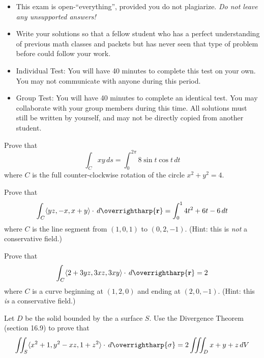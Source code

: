 \documentclass[12pt]{exam}
\newcommand{\harpvec}[1]{\overrightharp{\ensuremath{\mathbf{#1}}}}
\newcommand{\vect}[1]{\harpvec{#1}}
\newcommand{\<}{\langle}
\renewcommand{\>}{\rangle}
\begin{document}
\begin{center}
\end{center}
\vspace{0.1in}

\vspace{12pt}

\begin{itemize}
  \item This exam is open-``everything'', provided you do not plagiarize.
        \textit{Do not leave any unsupported answers!}
  \item Write your solutions so that a fellow student who has a perfect
        understanding of previous math classes and packets but
        has never seen that type of problem before could follow your work.
  \item Individual Test: You will have 40 minutes to complete this test
        on your own. You may not communicate with anyone during this period.
  \item Group Test: You will have 40 minutes to complete an identical test.
        You may collaborate with your group members during this time. All
        solutions must still be written by yourself, and may not be directly
        copied from another student.
\end{itemize}

\newpage

\begin{questions}

\setcounter{question}{0}

\question[8]
  Prove that \[\int_C xy\,d{s}=\int_0^{2\pi} 8\sin t\cos t\,d{t}\]
  where \(C\) is the full counter-clockwise rotation of the circle
  \(x^2+y^2=4\).

\newpage

\question[7]
  Prove that
    \[
      \int_C \<yz,-x,x+y\>\cdot\,d\vect{r}
        =
      \int_0^1 4t^2+6t-6\,dt
    \]
  where \(C\) is the line segment from \((1,0,1)\) to \((0,2,-1)\).
  (Hint: this is \textit{not} a conservative field.)

\newpage

\question[8] %
  Prove that
    \[
      \int_C \<2+3yz,3xz,3xy\>\cdot\,d\vect{r}
        =
      2
    \]
  where \(C\) is a curve beginning at \((1,2,0)\) and ending at
  \((2,0,-1)\). (Hint: this \textit{is} a conservative field.)

\newpage

\question[7]
  Let \(D\) be the solid bounded by the a surface \(S\).
  Use the Divergence Theorem (section 16.9) to prove that
    \[
      \iint_S \<x^2+1,y^2-xz,1+z^2\>\cdot\,d\vect{\sigma}
        =
      2\iiint_D x+y+z\,dV
    \]



\end{questions}
\end{document}
